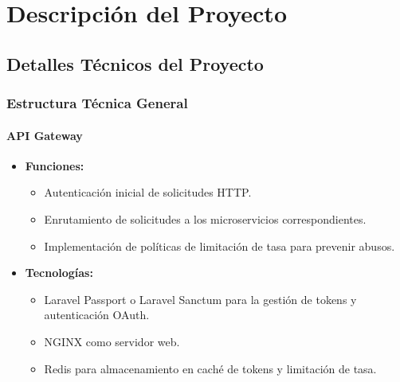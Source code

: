 
\section{Descripción del Proyecto}

\subsection{Detalles Técnicos del Proyecto}

\subsubsection{Estructura Técnica General}

\paragraph{API Gateway}
\begin{itemize}
    \item \textbf{Funciones:}
          \begin{itemize}
              \item Autenticación inicial de solicitudes HTTP.
              \item Enrutamiento de solicitudes a los microservicios correspondientes.
              \item Implementación de políticas de limitación de tasa para prevenir abusos.
          \end{itemize}
    \item \textbf{Tecnologías:}
          \begin{itemize}
              \item Laravel Passport o Laravel Sanctum para la gestión de tokens y autenticación OAuth.
              \item NGINX como servidor web.
              \item Redis para almacenamiento en caché de tokens y limitación de tasa.
          \end{itemize}
\end{itemize}

